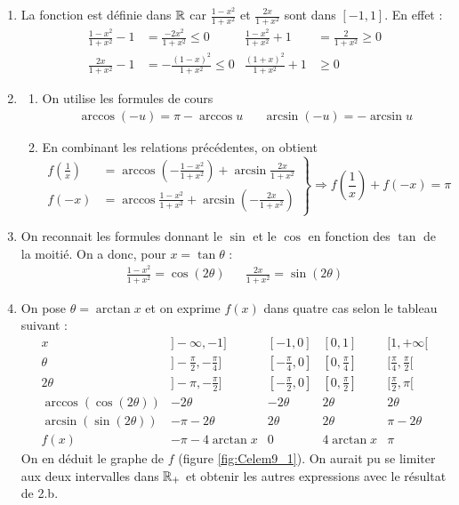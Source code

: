 \begin{enumerate}
 \item La fonction est définie dans $\mathbb{R}$ car $\frac{1-x^2}{1+x^2}$ et $\frac{2x}{1+x^2}$ sont dans $[-1,1]$. En effet :
\begin{align*}
 \frac{1-x^2}{1+x^2}-1 &= \frac{-2x^2}{1+x^2}\leq 0 &   \frac{1-x^2}{1+x^2}+1&=\frac{2}{1+x^2} \geq 0\\
 \frac{2x}{1+x^2}-1 &= -\frac{(1-x)^2}{1+x^2}\leq 0 &   \frac{(1+x)^2}{1+x^2}+1 &\geq 0 
\end{align*}
\item \begin{enumerate}
 \item On utilise les formules de cours 
\begin{align*}
 \arccos (-u) = \pi -\arccos u & & \arcsin (-u )= -\arcsin u
\end{align*}
\item En combinant les relations précédentes, on obtient
\begin{displaymath}
\left.
\begin{aligned}
 f(\frac{1}{x})&=\arccos\left(-\frac{1-x^2}{1+x^2} \right) +\arcsin\frac{2x}{1+x^2}\\
f(-x)&=\arccos\frac{1-x^2}{1+x^2} +\arcsin\left(-\frac{2x}{1+x^2} \right) 
\end{aligned}
\right\rbrace \Rightarrow
 f(\frac{1}{x}) + f(-x) = \pi
\end{displaymath}
\end{enumerate}
\item On reconnait les formules donnant le $\sin$ et le $\cos$ en fonction des $\tan$ de la moitié. On a donc, pour $x= \tan \theta$ :
\begin{align*}
 \frac{1-x^2}{1+x^2}= \cos (2\theta) & & \frac{2x}{1+x^2}= \sin (2\theta)
\end{align*}
\item On pose $\theta = \arctan x$ et on exprime $f(x)$ dans quatre cas selon le tableau suivant :
\renewcommand{\arraystretch}{1.7}
\begin{displaymath}
\begin{array}{c|c|c|c|c}
 x & ]-\infty,-1] & [-1,0] & [0,1] & [1,+\infty[  \\ \hline
 \theta & ]-\frac{\pi}{2},-\frac{\pi}{4}]  & [-\frac{\pi}{4},0] & [0,\frac{\pi}{4}] & [\frac{\pi}{4},\frac{\pi}{2}[ \\ \hline
 2\theta & ]-\pi ,-\frac{\pi}{2}]  & [-\frac{\pi}{2},0] & [0,\frac{\pi}{2}] & [\frac{\pi}{2},\pi[ \\ \hline
 \arccos (\cos (2\theta)) & -2\theta & -2\theta & 2\theta & 2\theta \\ \hline
 \arcsin (\sin (2\theta)) & -\pi -2\theta & 2\theta & 2\theta & \pi -2\theta \\ \hline
 f(x) & -\pi - 4\arctan x & 0 & 4\arctan x & \pi
\end{array}
\end{displaymath}
On en déduit le graphe de $f$ (figure \ref{fig:Celem9_1}). On aurait pu se limiter aux deux intervalles dans $\mathbb{R}_+$ et obtenir les autres expressions avec le résultat de 2.b.
\end{enumerate}
